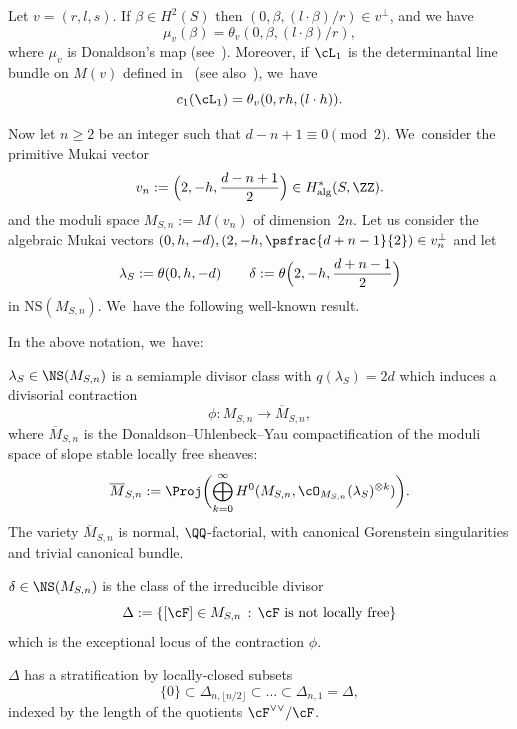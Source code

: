 \begin{rema}\label{rema:dondivisors}
Let $v=(r,l,s)$.
If $\beta\in H^2(S)$ then
$(0,\beta,(l\cdot \beta)/r)\in v^{\bot}$, and we have
\begin{equation*}
\mu_v(\beta)=\theta_v(0,\beta,(l\cdot \beta)/r),
\end{equation*}
where $\mu_v$ is Donaldson's map (see~\cite[\S 3]{Kieran:weight2}). Moreover, if $\cL_1$ is the determinantal line bundle on $M(v)$ defined in~\cite{LePotier:DetLineBundle} (see also~\cite[\S 8.1]{HL:moduli}), we~have
\begin{equation*}
c_1(\cL_1)=\theta_v(0,rh,(l\cdot h)).
\end{equation*}
\end{rema}

Now let $n\geq2$ be an integer such that $d-n+1\equiv 0 \pmod 2$. We~consider the primitive Mukai vector
\begin{equation*}
v_n:=\Bigl(2,-h,\frac{d-n+1}{2}\Bigr)\in H^{*}_\mathrm{alg}(S,\ZZ).
\end{equation*}
and the moduli space $M_{S,n}:=M(v_n)$ of dimension~$2n$.
Let us consider the algebraic Mukai vectors $(0,h,-d),(2,-h,\psfrac{d+n-1}{2})\in v_n^\perp$ and let
\begin{equation}\label{lamdel}
\lambda_S := \theta(0,h,-d) \qquad
\delta:=\theta\Bigl(2,-h,\frac{d+n-1}{2}\Bigr)
\end{equation}
in $\mathrm{NS}(M_{S,n})$. We~have the following well-known result.

\begin{lemm}\label{lem:DUYdivisor}
In the above notation, we~have:
\begin{enumeratea}
\item\label{enum:DUYdivisor1} $\lambda_S\in\NS(M_{S,n})$ is a semiample divisor class with $q(\lambda_S)=2d$ which induces a divisorial contraction
\[
\phi\colon M_{S,n} \to \overline{M}_{S,n},
\]
where $\overline{M}_{S,n}$ is the Donaldson--Uhlenbeck--Yau compactification of the moduli space of slope stable locally free sheaves:
\[
\overline{M}_{S,n}:=\Proj\biggl(\bigoplus_{k=0}^{\infty} H^0(M_{S,n},\cO_{M_{S,n}}(\lambda_S)^{\otimes k})\biggr).
\]
The variety $\overline{M}_{S,n}$ is normal, $\QQ$-factorial, with canonical Gorenstein singularities and trivial canonical bundle.
\item\label{enum:DUYdivisor2} $\delta\in\NS(M_{S,n})$ is the class of the irreducible divisor
\[
\Delta:=\left\{[\cF]\in M_{S,n} \,:\, \text{$\cF$ is not locally free}\right\}
\]
which is the exceptional locus of the contraction $\phi$.
\item\label{enum:DUYdivisor3} $\Delta$ has a stratification by locally-closed subsets
\[
\{ 0 \} \subset \Delta_{n,\lfloor n/2\rfloor} \subset \ldots \subset \Delta_{n,1} = \Delta,
\]
indexed by the length of the quotients $\cF^{\vee\vee}/\cF$.
\end{enumeratea}
\end{lemm}

